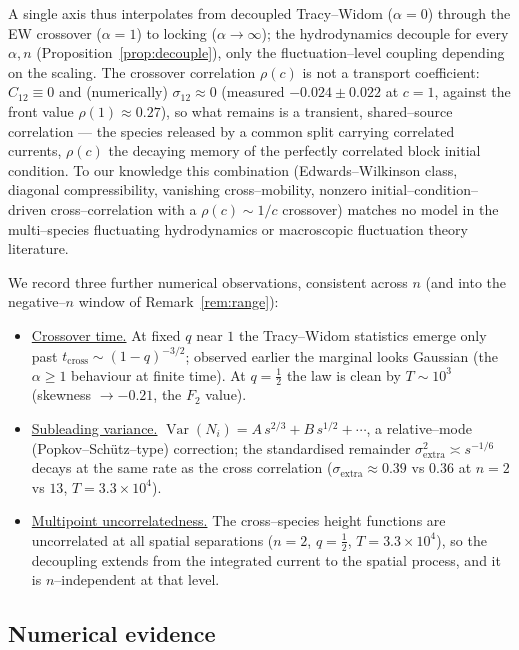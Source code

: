 \documentclass[11pt]{article}
\theoremstyle{plain}
\theoremstyle{definition}
\theoremstyle{remark}
\DeclareMathOperator{\Var}{Var}\DeclareMathOperator{\Cov}{Cov}
\begin{document}
\noindent A single axis thus interpolates from decoupled Tracy--Widom ($\alpha=0$)
through the EW crossover ($\alpha=1$) to locking ($\alpha\to\infty$); the hydrodynamics
decouple for every $\alpha,n$ (Proposition~\ref{prop:decouple}), only the
fluctuation--level coupling depending on the scaling. The crossover correlation
$\rho(c)$ is not a transport coefficient: $C_{12}\equiv0$ and (numerically)
$\sigma_{12}\approx0$ (measured $-0.024\pm0.022$ at $c=1$, against the front value
$\rho(1)\approx0.27$), so what remains is a transient, shared--source correlation --- the
species released by a common split carrying correlated currents, $\rho(c)$ the decaying
memory of the perfectly correlated block initial condition. To our knowledge this
combination (Edwards--Wilkinson class, diagonal compressibility, vanishing
cross--mobility, nonzero initial--condition--driven cross--correlation with a
$\rho(c)\sim1/c$ crossover) matches no model in the multi--species fluctuating
hydrodynamics or macroscopic fluctuation theory literature.

We record three further numerical observations, consistent across $n$ (and into the
negative--$n$ window of Remark~\ref{rem:range}):
\begin{itemize}
\item \underline{Crossover time.} At fixed $q$ near $1$ the Tracy--Widom statistics emerge only
past $t_{\mathrm{cross}}\sim(1-q)^{-3/2}$; observed earlier the marginal looks Gaussian
(the $\alpha\ge1$ behaviour at finite time). At $q=\tfrac12$ the law is clean by
$T\sim10^3$ (skewness $\to-0.21$, the $F_2$ value).
\item \underline{Subleading variance.} $\Var(N_i)=A\,s^{2/3}+B\,s^{1/2}+\cdots$, a
relative--mode (Popkov--Sch\"utz--type) correction; the standardised remainder
$\sigma_{\mathrm{extra}}^2\asymp s^{-1/6}$ decays at the same rate as the cross
correlation ($\sigma_{\mathrm{extra}}\approx0.39$ vs $0.36$ at $n=2$ vs $13$,
$T=3.3\times10^4$).
\item \underline{Multipoint uncorrelatedness.} The cross--species height functions are
uncorrelated at all spatial separations ($n=2$, $q=\tfrac12$, $T=3.3\times10^4$), so
the decoupling extends from the integrated current to the spatial process, and it is
$n$--independent at that level.
\end{itemize}

\subsection{Numerical evidence}\label{sec:numerics}
\end{document}
